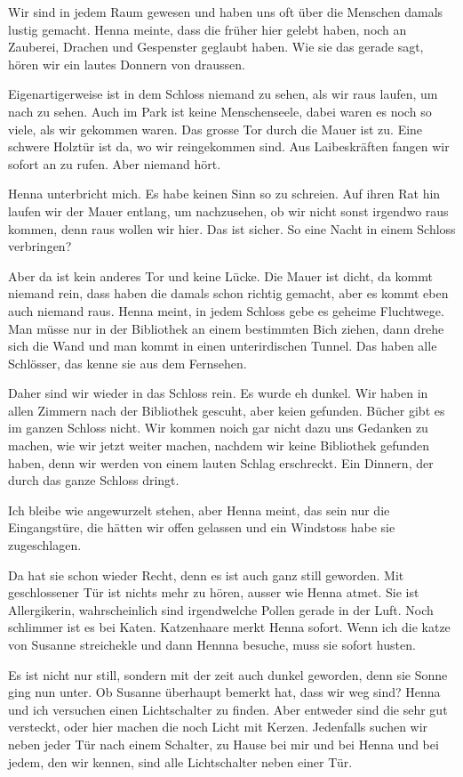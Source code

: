 Wir sind in jedem Raum gewesen und haben uns oft über die Menschen damals lustig gemacht. Henna meinte, dass die früher hier gelebt haben, noch an Zauberei, Drachen und Gespenster geglaubt haben. Wie sie das gerade sagt, hören wir ein lautes Donnern von draussen.

Eigenartigerweise ist in dem Schloss niemand zu sehen, als wir raus laufen, um nach zu sehen. Auch im Park ist keine Menschenseele, dabei waren es noch so viele, als wir gekommen waren. Das grosse Tor durch die Mauer ist zu. Eine schwere Holztür ist da, wo wir reingekommen sind. Aus Laibeskräften fangen wir sofort an zu rufen. Aber niemand hört.

Henna unterbricht mich. Es habe keinen Sinn so zu schreien. Auf ihren Rat hin laufen wir der Mauer entlang, um nachzusehen, ob wir nicht sonst irgendwo raus kommen, denn raus wollen wir hier. Das ist sicher. So eine Nacht in einem Schloss verbringen?

Aber da ist kein anderes Tor und keine Lücke. Die Mauer ist dicht, da kommt niemand rein, dass haben die damals schon richtig gemacht, aber es kommt eben auch niemand raus. Henna meint, in jedem Schloss gebe es geheime Fluchtwege. Man müsse nur in der Bibliothek an einem bestimmten Bich ziehen, dann drehe sich die Wand und man kommt in einen unterirdischen Tunnel. Das haben alle Schlösser, das kenne sie aus dem Fernsehen.

Daher sind wir wieder in das Schloss rein. Es wurde eh dunkel. Wir haben in allen Zimmern nach der Bibliothek gescuht, aber keien gefunden. Bücher gibt es im ganzen Schloss nicht. Wir kommen noich gar nicht dazu uns Gedanken zu machen, wie wir jetzt weiter machen, nachdem wir keine Bibliothek gefunden haben, denn wir werden von einem lauten Schlag erschreckt. Ein Dinnern, der durch das ganze Schloss dringt.

Ich bleibe wie angewurzelt stehen, aber Henna meint, das sein nur die Eingangstüre, die hätten wir offen gelassen und ein Windstoss habe sie zugeschlagen.

Da hat sie schon wieder Recht, denn es ist auch ganz still geworden. Mit geschlossener Tür ist nichts mehr zu hören, ausser wie Henna atmet. Sie ist Allergikerin, wahrscheinlich sind irgendwelche Pollen gerade in der Luft. Noch schlimmer ist es bei Katen. Katzenhaare merkt Henna sofort. Wenn ich die katze von Susanne streichekle und dann Hennna besuche, muss sie sofort husten.

Es ist nicht nur still, sondern mit der zeit auch dunkel geworden, denn sie Sonne ging nun unter. Ob Susanne überhaupt bemerkt hat, dass wir weg sind? Henna und ich versuchen einen Lichtschalter zu finden. Aber entweder sind die sehr gut versteckt, oder hier machen die noch Licht mit Kerzen. Jedenfalls suchen wir neben jeder Tür nach einem Schalter, zu Hause bei mir und bei Henna und bei jedem, den wir kennen, sind alle Lichtschalter neben einer Tür.

